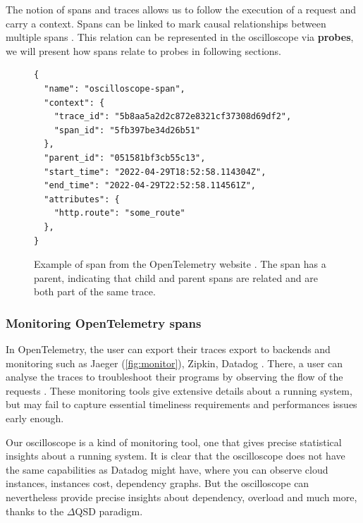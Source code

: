     The notion of spans and traces allows us to follow the execution of a request and carry a context. Spans can be linked to mark causal relationships between multiple spans \cite{otel-t}. This relation can be represented in the oscilloscope via \textbf{probes}, we will present how spans relate to probes in following sections.
    \begin{figure}[H]
    \begin{verbatim} 
{
  "name": "oscilloscope-span",
  "context": {
    "trace_id": "5b8aa5a2d2c872e8321cf37308d69df2",
    "span_id": "5fb397be34d26b51"
  },
  "parent_id": "051581bf3cb55c13",
  "start_time": "2022-04-29T18:52:58.114304Z",
  "end_time": "2022-04-29T22:52:58.114561Z",
  "attributes": {
    "http.route": "some_route"
  },
}
    \end{verbatim}
    \caption{Example of span from the OpenTelemetry website \cite{otel-t}. The span has a parent, indicating that child and parent spans are related and are both part of the same trace.}%
    \end{figure}

    \subsubsection{Monitoring OpenTelemetry spans}
        In OpenTelemetry, the user can export their traces export to backends and monitoring such as Jaeger (\cref{fig:monitor}), Zipkin, Datadog \cite{otel-exp}. There, a user can analyse the traces to troubleshoot their programs by observing the flow of the requests \cite{jg}. These monitoring tools give extensive details about a running system, but may fail to capture essential timeliness requirements and performances issues early enough.
        
        Our oscilloscope is a kind of monitoring tool, one that gives precise statistical insights about a running system. It is clear that the oscilloscope does not have the same capabilities as Datadog \cite{datadog} might have, where you can observe cloud instances, instances cost, dependency graphs. But the oscilloscope can nevertheless provide precise insights about dependency, overload and much more, thanks to the $\Delta$QSD paradigm. 

